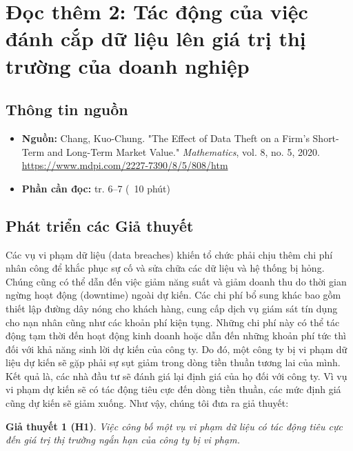 \chapter{Đọc thêm 2: Tác động của việc đánh cắp dữ liệu lên giá trị thị trường của doanh nghiệp}
\label{ch:M2L4-reading2}


\section{Thông tin nguồn}

\begin{itemize}
  \item \textbf{Nguồn:} Chang, Kuo-Chung. "The Effect of Data Theft on a Firm's Short-Term and Long-Term Market Value." \emph{Mathematics}, vol. 8, no. 5, 2020. \url{https://www.mdpi.com/2227-7390/8/5/808/htm}
  \item \textbf{Phần cần đọc:} tr. 6--7 (~10 phút)
\end{itemize}

\section{Phát triển các Giả thuyết}

Các vụ vi phạm dữ liệu (data breaches) khiến tổ chức phải chịu thêm chi phí nhân công để khắc phục sự cố và sửa chữa các dữ liệu và hệ thống bị hỏng. Chúng cũng có thể dẫn đến việc giảm năng suất và giảm doanh thu do thời gian ngừng hoạt động (downtime) ngoài dự kiến. Các chi phí bổ sung khác bao gồm thiết lập đường dây nóng cho khách hàng, cung cấp dịch vụ giám sát tín dụng cho nạn nhân cũng như các khoản phí kiện tụng. Những chi phí này có thể tác động tạm thời đến hoạt động kinh doanh hoặc dẫn đến những khoản phí tức thì đối với khả năng sinh lời dự kiến của công ty. Do đó, một công ty bị vi phạm dữ liệu dự kiến sẽ gặp phải sự sụt giảm trong dòng tiền thuần tương lai của mình. Kết quả là, các nhà đầu tư sẽ đánh giá lại định giá của họ đối với công ty. Vì vụ vi phạm dự kiến sẽ có tác động tiêu cực đến dòng tiền thuần, các mức định giá cũng dự kiến sẽ giảm xuống. Như vậy, chúng tôi đưa ra giả thuyết:

\textbf{Giả thuyết 1 (H1)}. \emph{Việc công bố một vụ vi phạm dữ liệu có tác động tiêu cực đến giá trị thị trường ngắn hạn của công ty bị vi phạm.}

